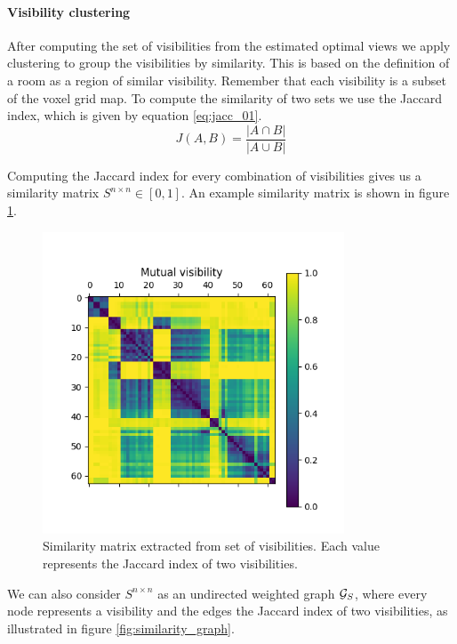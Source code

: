 \paragraph{Visibility clustering}
After computing the set of visibilities from the estimated optimal views we apply clustering to group the visibilities by similarity. This is based on the definition of a room as a region of similar visibility. Remember that each visibility is a subset of the voxel grid map. To compute the similarity of two sets we use the Jaccard index, which is given by equation \ref{eq:jacc_01}.
\begin{equation}
    \label{eq:jacc_01}
    J(A,B) = \frac{|A \cap B|}{|A \cup B|}
\end{equation}

Computing the Jaccard index for every combination of visibilities gives us a similarity matrix \(S^{n \times n} \in [0, 1]\).  An example similarity matrix is shown in figure \ref{fig:jaccard}.

\begin{figure}[h]
    \centering
    \includegraphics*[width=0.8\textwidth]{./fig/mutual_visibility_matrix.png}
    \caption{Similarity matrix extracted from set of visibilities. Each value represents the Jaccard index of two visibilities.}
    \label{fig:jaccard}
\end{figure}

We can also consider \(S^{n \times n}\) as an undirected weighted graph \(\mathcal{G}_S\), where every node represents a visibility and the edges the Jaccard index of two visibilities, as illustrated in figure \ref{fig:similarity_graph}.

